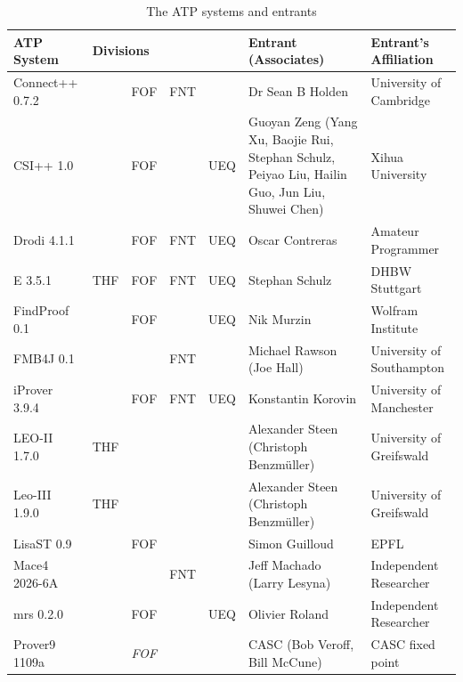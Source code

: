 \documentclass[aic]{iosart2x}
\begin{document}
\begin{table}
\setlength{\tabcolsep}{5pt}
\footnotesize
\caption{The ATP systems and entrants}
\label{Entrants}
\begin{tabular}{lp{1.5em}p{1.5em}p{1.5em}p{1.5em}>{\raggedright\arraybackslash}p{4.4cm}>{\raggedright\arraybackslash}p{3.4cm}}
ATP System                & \multicolumn{4}{l}{Divisions} & Entrant (Associates)              & Entrant's Affiliation\\
\hline
Connect++ 0.7.2           &   &FOF&FNT&   & Dr Sean B Holden                                  & University of Cambridge \\
CSI++ 1.0                 &   &FOF&   &UEQ& Guoyan Zeng (Yang Xu, Baojie Rui, Stephan Schulz, Peiyao Liu, Hailin Guo, Jun Liu, Shuwei Chen)
                                                                                              & Xihua University \\
Drodi 4.1.1               &   &FOF&FNT&UEQ& Oscar Contreras                                   & Amateur Programmer \\
E 3.5.1                   &THF&FOF&FNT&UEQ& Stephan Schulz                                    & DHBW Stuttgart \\
FindProof 0.1             &   &FOF&   &UEQ& Nik Murzin                                        & Wolfram Institute \\
FMB4J 0.1                 &   &   &FNT&   & Michael Rawson (Joe Hall)                         & University of Southampton \\
iProver 3.9.4             &   &FOF&FNT&UEQ& Konstantin Korovin                                & University of Manchester \\
LEO-II 1.7.0              &THF&   &   &   & Alexander Steen (Christoph Benzmüller)            & University of Greifswald \\
Leo-III 1.9.0             &THF&   &   &   & Alexander Steen (Christoph Benzmüller)            & University of Greifswald \\
LisaST 0.9                &   &FOF&   &   & Simon Guilloud                                    & EPFL \\
Mace4 2026-6A             &   &   &FNT&   & Jeff Machado (Larry Lesyna)                       & Independent Researcher \\
mrs 0.2.0                 &   &FOF&   &UEQ& Olivier Roland                                    & Independent Researcher \\
Prover9 1109a             &   &{\em FOF}&   &   & CASC (Bob Veroff, Bill McCune)              & CASC fixed point \\

\end{tabular}
\end{table}
\end{document}
